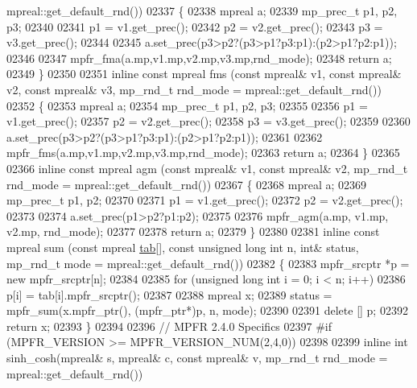 \begin{DoxyCode}
{{      mpreal::get\_default\_rnd())
02337 \{
02338     mpreal a;
02339     mp\_prec\_t p1, p2, p3;
02340 
02341     p1 = v1.get\_prec();
02342     p2 = v2.get\_prec();
02343     p3 = v3.get\_prec();
02344 
02345     a.set\_prec(p3>p2?(p3>p1?p3:p1):(p2>p1?p2:p1));
02346 
02347     mpfr\_fma(a.mp,v1.mp,v2.mp,v3.mp,rnd\_mode);
02348     \textcolor{keywordflow}{return} a;
02349 \}
02350 
02351 \textcolor{keyword}{inline} \textcolor{keyword}{const} mpreal fms (\textcolor{keyword}{const} mpreal& v1, \textcolor{keyword}{const} mpreal& v2, \textcolor{keyword}{const} mpreal& v3, mp\_rnd\_t rnd\_mode = 
      mpreal::get\_default\_rnd())
02352 \{
02353     mpreal a;
02354     mp\_prec\_t p1, p2, p3;
02355 
02356     p1 = v1.get\_prec();
02357     p2 = v2.get\_prec();
02358     p3 = v3.get\_prec();
02359 
02360     a.set\_prec(p3>p2?(p3>p1?p3:p1):(p2>p1?p2:p1));
02361 
02362     mpfr\_fms(a.mp,v1.mp,v2.mp,v3.mp,rnd\_mode);
02363     \textcolor{keywordflow}{return} a;
02364 \}
02365 
02366 \textcolor{keyword}{inline} \textcolor{keyword}{const} mpreal agm (\textcolor{keyword}{const} mpreal& v1, \textcolor{keyword}{const} mpreal& v2, mp\_rnd\_t rnd\_mode = mpreal::get\_default\_rnd())
02367 \{
02368     mpreal a;
02369     mp\_prec\_t p1, p2;
02370 
02371     p1 = v1.get\_prec();
02372     p2 = v2.get\_prec();
02373 
02374     a.set\_prec(p1>p2?p1:p2);
02375 
02376     mpfr\_agm(a.mp, v1.mp, v2.mp, rnd\_mode);
02377 
02378     \textcolor{keywordflow}{return} a;
02379 \}
02380 
02381 \textcolor{keyword}{inline} \textcolor{keyword}{const} mpreal sum (\textcolor{keyword}{const} mpreal \hyperlink{structtab}{tab}[], \textcolor{keyword}{const} \textcolor{keywordtype}{unsigned} \textcolor{keywordtype}{long} \textcolor{keywordtype}{int} n, \textcolor{keywordtype}{int}& status, mp\_rnd\_t mode = 
      mpreal::get\_default\_rnd())
02382 \{
02383     mpfr\_srcptr *p = \textcolor{keyword}{new} mpfr\_srcptr[n];
02384 
02385     \textcolor{keywordflow}{for} (\textcolor{keywordtype}{unsigned} \textcolor{keywordtype}{long} \textcolor{keywordtype}{int}  i = 0; i < n; i++)
02386         p[i] = tab[i].mpfr\_srcptr();
02387 
02388     mpreal x;
02389     status = mpfr\_sum(x.mpfr\_ptr(), (mpfr\_ptr*)p, n, mode);
02390 
02391     \textcolor{keyword}{delete} [] p;
02392     \textcolor{keywordflow}{return} x;
02393 \}
02394 
02396 \textcolor{comment}{// MPFR 2.4.0 Specifics}
02397 \textcolor{preprocessor}{#if (MPFR\_VERSION >= MPFR\_VERSION\_NUM(2,4,0))}
02398 
02399 \textcolor{keyword}{inline} \textcolor{keywordtype}{int} sinh\_cosh(mpreal& s, mpreal& c, \textcolor{keyword}{const} mpreal& v, mp\_rnd\_t rnd\_mode = mpreal::get\_default\_rnd())
}}
\end{DoxyCode}
